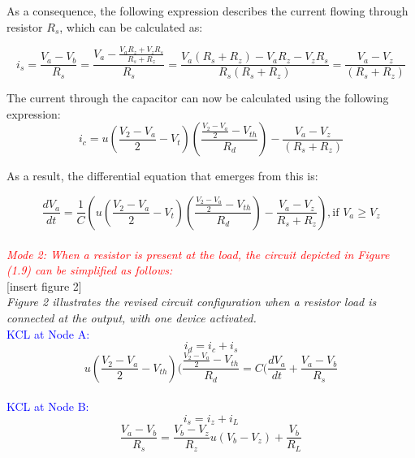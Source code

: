 As a consequence, the following expression describes the current flowing through resistor $R_s$, which can be calculated as:

\begin{equation}
    i_s=\frac{V_a-V_b}{R_s}=\frac{V_a-\frac{V_aR_z+V_zR_s}{R_s+R_z}}{R_s}=\frac{V_a(R_s+R_z)-V_aR_z-V_zR_s}{R_s(R_s+R_z)}=\frac{V_a-V_z}{(R_s+R_z)}
\end{equation}

The current through the capacitor can now be calculated using the following expression:\\

\begin{equation}
    i_c=u(\frac{V_2-V_a}{2}-V_t)(\frac{\frac{V_2-V_a}{2}-V_{th}}{R_d})-\frac{V_a-V_z}{(R_s+R_z)}
\end{equation}


As a result, the differential equation that emerges from this is:

\begin{equation}
    \frac{dV_a}{dt}=\frac{1}{C}\left(u\left(\frac{V_2-V_a}{2}-V_t\right)\left(\frac{\frac{V_2-V_a}{2}-V_{th}}{R_d}\right)-\frac{V_a-V_z}{R_s+R_z}\right), \text{if } V_a \geq V_z
\end{equation}\\

\large\textcolor{red}{\emph{Mode 2: When a resistor is present at the load, the circuit depicted in Figure (1.9) can be simplified as follows:}}\\

[insert figure 2]\\

\emph{Figure 2 illustrates the revised circuit configuration when a resistor load is connected at the output, with one device activated.}\\

\textcolor{blue}{KCL at Node A:}\\
\begin{equation}
    i_d=i_c+i_s
\end{equation}
\begin{equation}
    u(\frac{V_2-V_a}{2}-V_{th})(\frac{\frac{V_2-V_a}{2}-V_{th}}{R_d}=C(\frac{dV_a}{dt}+\frac{V_a-V_b}{R_s}
\end{equation}\\

\textcolor{blue}{KCL at Node B:}\\
\begin{equation}
    i_s=i_z+i_L
\end{equation}
\begin{equation}
    \frac{V_a-V_b}{R_s}=\frac{V_b-V_z}{R_z}u(V_b-V_z)+\frac{V_b}{R_L}
\end{equation}\\

